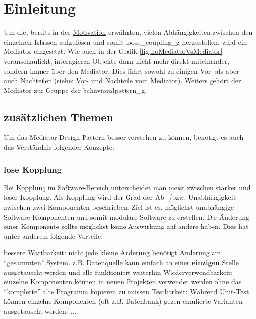 \chapter{Einleitung}\label{ref:einleitung}
Um die, bereits in der \hyperref[ref:motivation]{Motivation} erwähnten, vielen Abhängigkeiten zwischen den einzelnen Klassen aufzulösen und somit \gls{loose_coupling_g} herzustellen, wird ein Mediator eingesetzt. Wie auch in der Grafik \ref{fig:noMediatorVsMediator} veranschaulicht, interagieren Objekte dann nicht mehr direkt miteinander, sondern immer über den Mediator. Dies führt sowohl zu einigen Vor- als aber auch Nachteilen (siehe: \hyperref[ref:vorteileNachteile]{Vor- und Nachteile vom Mediator}). Weiters gehört der Mediator zur Gruppe der \gls{behavioralpattern_g}.
\autocite[vgl.][S. 273ff]{gangoffour_book}
%
\section{zusätzlichen Themen}
Um das Mediator Design-Pattern besser verstehen zu können, benötigt es auch das Verständnis folgender Konzepte:
\subsection{lose Kopplung}\label{ref:looseCoupling}
Bei Kopplung im Software-Bereich unterscheidet man meist zwischen starker und loser Kopplung. Als Kopplung wird der Grad der Ab- /bzw. Unabhängigkeit zwischen zwei Komponenten beschrieben. Ziel ist es, möglichst unabhängige Software-Komponenten und somit modulare Software zu erstellen. Die Änderung einer Komponente sollte möglichst keine Auswirkung auf andere haben. Dies hat unter anderem folgende Vorteile: 
\begin{outline}\label{ref:prosLoseKopplung}
    \1 bessere Wartbarkeit: nicht jede kleine Änderung benötigt Änderung am \enquote{gesammten} System. z.B. Datenquelle kann einfach an einer \textbf{einzigen} Stelle ausgetauscht werden und alle funktioniert weiterhin
    \1 Wiederverwendbarkeit: einzelne Komponenten können in neuen Projekten verwendet werden ohne das \enquote{komplette} alte Programm kopieren zu müssen
    \1 Testbarkeit: Während Unit-Test können einzelne Komponenten (oft z.B. Datenbank) gegen emulierte Varianten ausgetauscht werden.
    \1 ...
\end{outline}

